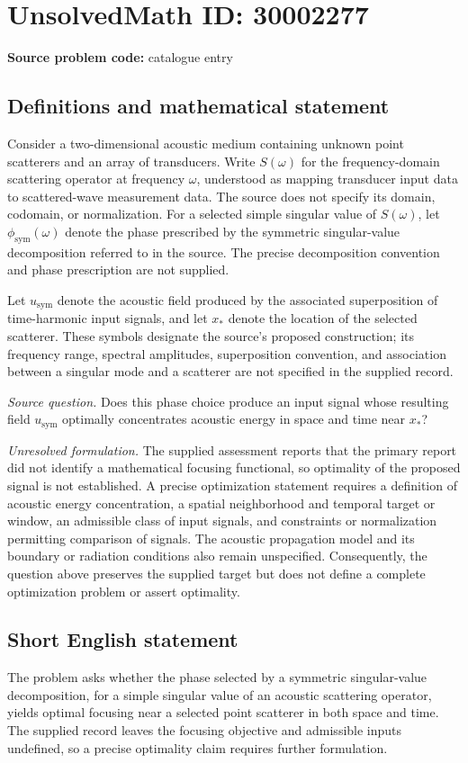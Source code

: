 \documentclass[11pt]{article}
\begin{document}
\section*{UnsolvedMath ID: 30002277}
\textbf{Source problem code:} catalogue entry
\subsection{Definitions and mathematical statement}
Consider a two-dimensional acoustic medium containing unknown point scatterers and an array of transducers. Write \(S(\omega)\) for the frequency-domain scattering operator at frequency \(\omega\), understood as mapping transducer input data to scattered-wave measurement data. The source does not specify its domain, codomain, or normalization. For a selected simple singular value of \(S(\omega)\), let \(\phi_{\mathrm{sym}}(\omega)\) denote the phase prescribed by the symmetric singular-value decomposition referred to in the source. The precise decomposition convention and phase prescription are not supplied.

Let \(u_{\mathrm{sym}}\) denote the acoustic field produced by the associated superposition of time-harmonic input signals, and let \(x_*\) denote the location of the selected scatterer. These symbols designate the source's proposed construction; its frequency range, spectral amplitudes, superposition convention, and association between a singular mode and a scatterer are not specified in the supplied record.

\emph{Source question.} Does this phase choice produce an input signal whose resulting field \(u_{\mathrm{sym}}\) optimally concentrates acoustic energy in space and time near \(x_*\)?

\emph{Unresolved formulation.} The supplied assessment reports that the primary report did not identify a mathematical focusing functional, so optimality of the proposed signal is not established. A precise optimization statement requires a definition of acoustic energy concentration, a spatial neighborhood and temporal target or window, an admissible class of input signals, and constraints or normalization permitting comparison of signals. The acoustic propagation model and its boundary or radiation conditions also remain unspecified. Consequently, the question above preserves the supplied target but does not define a complete optimization problem or assert optimality.
\subsection{Short English statement}
The problem asks whether the phase selected by a symmetric singular-value decomposition, for a simple singular value of an acoustic scattering operator, yields optimal focusing near a selected point scatterer in both space and time. The supplied record leaves the focusing objective and admissible inputs undefined, so a precise optimality claim requires further formulation.
\end{document}
